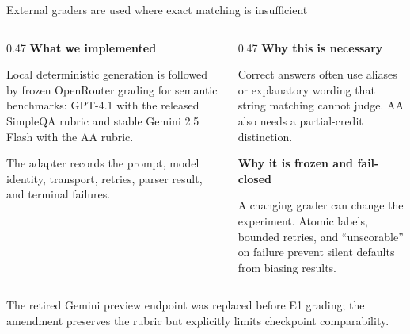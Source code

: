 \documentclass[aspectratio=169,11pt]{beamer}
\begin{document}
\begin{frame}{External graders are used where exact matching is insufficient}
  \small
  \begin{columns}[T,onlytextwidth]
    \begin{column}{0.47\textwidth}
      \textbf{What we implemented}\par\vspace{0.15cm}
      Local deterministic generation is followed by frozen OpenRouter grading for semantic benchmarks: GPT-4.1 with the released SimpleQA rubric and stable Gemini 2.5 Flash with the AA rubric.\par\vspace{0.35cm}
      The adapter records the prompt, model identity, transport, retries, parser result, and terminal failures.
    \end{column}
    \begin{column}{0.47\textwidth}
      \textbf{Why this is necessary}\par\vspace{0.15cm}
      Correct answers often use aliases or explanatory wording that string matching cannot judge. AA also needs a partial-credit distinction.\par\vspace{0.35cm}
      \textbf{Why it is frozen and fail-closed}\par
      A changing grader can change the experiment. Atomic labels, bounded retries, and ``unscorable'' on failure prevent silent defaults from biasing results.
    \end{column}
  \end{columns}
  \vspace{0.3cm}
  {\footnotesize\color{Muted}The retired Gemini preview endpoint was replaced before E1 grading; the amendment preserves the rubric but explicitly limits checkpoint comparability.}
\end{frame}
\end{document}
